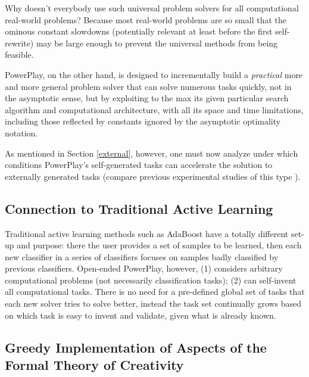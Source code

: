 \documentclass{article}
\begin{document}
Why doesn't everybody use such universal problem solvers for all computational
real-world  problems? Because most real-world problems
are so small that the ominous constant slowdowns (potentially relevant at least before
the first self-rewrite) may be large enough to prevent  the universal methods
from being  feasible.

{\sc PowerPlay}, on the other hand, is designed to incrementally build
a  {\em practical} more and more general problem solver that can solve 
numerous tasks quickly, not in the asymptotic sense,
but by exploiting to the max its given particular search algorithm 
and  computational 
architecture, with all its space and time limitations, including those 
reflected by constants  ignored by the asymptotic optimality notation.

As mentioned in Section \ref{external}, however, one must now analyze under which conditions 
{\sc PowerPlay}'s
self-generated tasks can accelerate the solution to externally generated
tasks (compare previous experimental studies of this type \cite{Schmidhuber:91singaporecur,Storck:95,Schmidhuber:99cec,Schmidhuber:02predictable}).

\subsection{Connection to Traditional Active Learning}
\label{active}

Traditional active learning methods \cite{Fedorov:72} such as AdaBoost \cite{Freund1997119} 
have a totally different set-up and purpose: there the user  
provides a set of samples to be learned, then each new classifier in a  
series of classifiers focuses on samples badly classified by previous  
classifiers. Open-ended {\sc PowerPlay}, however, 
(1) considers arbitrary computational problems (not necessarily classification tasks);
(2) can self-invent all computational tasks.
There is no  need for a
pre-defined global set of tasks that each new solver tries to solve  
better, instead the task set continually grows based on which task is  
easy to invent and validate, given what is already known.

\subsection{Greedy Implementation of Aspects of the Formal Theory of Creativity}
\label{creativity}
\end{document}
